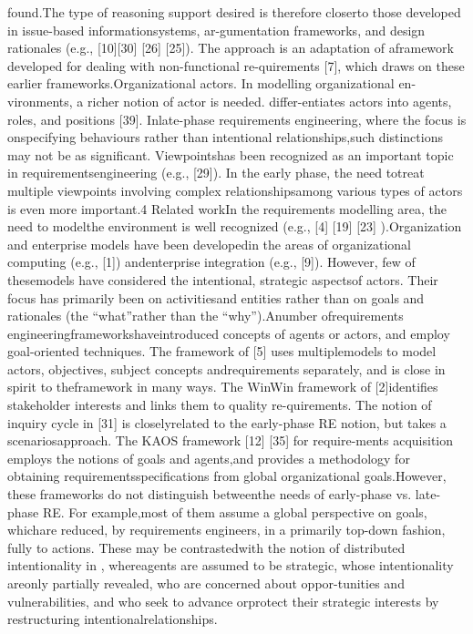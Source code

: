 found.The type of reasoning support desired is therefore closerto those developed in issue-based informationsystems, ar-gumentation frameworks, and design rationales (e.g., [10][30] [26] [25]). The approach is an adaptation of aframework developed for dealing with non-functional re-quirements [7], which draws on these earlier frameworks.Organizational actors. In modelling organizational en-vironments, a richer notion of actor is needed. differ-entiates actors into agents, roles, and positions [39]. Inlate-phase requirements engineering, where the focus is onspecifying behaviours rather than intentional relationships,such distinctions may not be as signiﬁcant. Viewpointshas been recognized as an important topic in requirementsengineering (e.g., [29]). In the early phase, the need totreat multiple viewpoints involving complex relationshipsamong various types of actors is even more important.4 Related workIn the requirements modelling area, the need to modelthe environment is well recognized (e.g., [4] [19] [23] ).Organization and enterprise models have been developedin the areas of organizational computing (e.g., [1]) andenterprise integration (e.g., [9]). However, few of thesemodels have considered the intentional, strategic aspectsof actors. Their focus has primarily been on activitiesand entities rather than on goals and rationales (the “what”rather than the “why”).Anumber ofrequirements engineeringframeworkshaveintroduced concepts of agents or actors, and employ goal-oriented techniques. The framework of [5] uses multiplemodels to model actors, objectives, subject concepts andrequirements separately, and is close in spirit to theframework in many ways. The WinWin framework of [2]identiﬁes stakeholder interests and links them to quality re-quirements. The notion of inquiry cycle in [31] is closelyrelated to the early-phase RE notion, but takes a scenariosapproach. The KAOS framework [12] [35] for require-ments acquisition employs the notions of goals and agents,and provides a methodology for obtaining requirementsspeciﬁcations from global organizational goals.However, these frameworks do not distinguish betweenthe needs of early-phase vs. late-phase RE. For example,most of them assume a global perspective on goals, whichare reduced, by requirements engineers, in a primarily top-down fashion, fully to actions. These may be contrastedwith the notion of distributed intentionality in , whereagents are assumed to be strategic, whose intentionality areonly partially revealed, who are concerned about oppor-tunities and vulnerabilities, and who seek to advance orprotect their strategic interests by restructuring intentionalrelationships.
